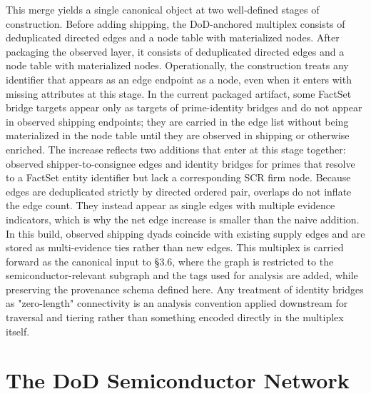 This merge yields a single canonical object at two well-defined stages of construction. Before adding shipping, the DoD-anchored multiplex consists of \PreShipEdges deduplicated directed edges and a node table with \PreShipNodes materialized nodes. After packaging the observed layer, it consists of \PostShipEdges deduplicated directed edges and a node table with \PostShipNodes materialized nodes. Operationally, the construction treats any identifier that appears as an edge endpoint as a node, even when it enters with missing attributes at this stage. In the current packaged artifact, some FactSet bridge targets appear only as targets of prime-identity bridges and do not appear in observed shipping endpoints; they are carried in the edge list without being materialized in the node table until they are observed in shipping or otherwise enriched. The increase reflects two additions that enter at this stage together: observed shipper-to-consignee edges and identity bridges for primes that resolve to a FactSet entity identifier but lack a corresponding SCR firm node. Because edges are deduplicated strictly by directed ordered pair, overlaps do not inflate the edge count. They instead appear as single edges with multiple evidence indicators, which is why the net edge increase is smaller than the naive addition. In this build, \ShippingOverlap observed shipping dyads coincide with existing supply edges and are stored as multi-evidence ties rather than new edges. This multiplex is carried forward as the canonical input to \S3.6, where the graph is restricted to the semiconductor-relevant subgraph and the tags used for analysis are added, while preserving the provenance schema defined here. Any treatment of identity bridges as "zero-length" connectivity is an analysis convention applied downstream for traversal and tiering rather than something encoded directly in the multiplex itself.

\section{The DoD Semiconductor Network}
\label{sec:dod-semiconductor-network}

